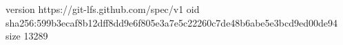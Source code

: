 version https://git-lfs.github.com/spec/v1
oid sha256:599b3ecaf8b12dff8dd9e6f805e3a7e5c22260c7de48b6abe5e3bcd9ed00de94
size 13289

